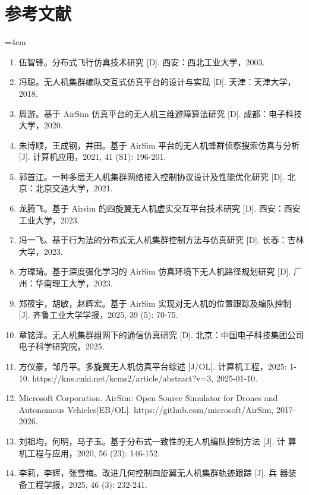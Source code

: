 
\clearpage
\chapter*{参考文献}
\begingroup
\small
\sloppy
\emergencystretch=4em

\begin{enumerate}
\item 伍智锋。分布式飞行仿真技术研究 {[}D{]}. 西安：西北工业大学，2003.
\item 冯聪。无人机集群编队交互式仿真平台的设计与实现 {[}D{]}. 天津：天津大学，2018.
\item 周游。基于 AirSim 仿真平台的无人机三维避障算法研究 {[}D{]}. 成都：电子科技大学，2020.
\item 朱博顺，王成钢，井田。基于 AirSim 平台的无人机蜂群侦察搜索仿真与分析 {[}J{]}. 计算机应用，2021, 41 (S1): 196-201.
\item 郭首江。一种多层无人机集群网络接入控制协议设计及性能优化研究 {[}D{]}. 北京：北京交通大学，2021.
\item 龙腾飞。基于 Airsim 的四旋翼无人机虚实交互平台技术研究 {[}D{]}. 西安：西安工业大学，2023.
\item 冯一飞。基于行为法的分布式无人机集群控制方法与仿真研究 {[}D{]}. 长春：吉林大学，2023.
\item 方璨琦。基于深度强化学习的 AirSim 仿真环境下无人机路径规划研究 {[}D{]}. 广州：华南理工大学，2023.
\item 郑筱宇，胡敏，赵辉宏。基于 AirSim 实现对无人机的位置跟踪及编队控制 {[}J{]}. 齐鲁工业大学学报，2025, 39 (5): 70-75.
\item 章铭泽。无人机集群组网下的通信仿真研究 {[}D{]}. 北京：中国电子科技集团公司电子科学研究院，2025.
\item 方仪豪，邹丹平。多旋翼无人机仿真平台综述 {[}J/OL{]}. 计算机工程，2025: 1-10. https:\allowbreak{}/\allowbreak{}/\allowbreak{}kns.\allowbreak{}cnki.\allowbreak{}net/\allowbreak{}kcms2/\allowbreak{}article/\allowbreak{}abstract?v=3, 2025-01-10.
\item Microsoft Corporation. AirSim: Open Source Simulator for Drones and Autonomous Vehicles{[}EB/OL{]}. https:\allowbreak{}/\allowbreak{}/\allowbreak{}github.\allowbreak{}com/\allowbreak{}microsoft/\allowbreak{}AirSim, 2017-2026.
\item 刘祖均，何明，马子玉。基于分布式一致性的无人机编队控制方法 {[}J{]}. 计 算机工程与应用，2020, 56 (23): 146-152.
\item 李莉，李辉，张雪梅。改进几何控制四旋翼无人机集群轨迹跟踪 {[}J{]}. 兵 器装备工程学报，2025, 46 (3): 232-241.

\end{enumerate}
